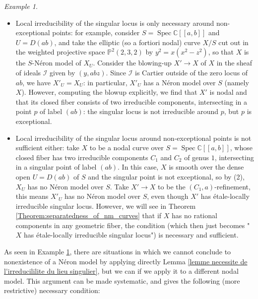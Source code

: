 \documentclass[a4paper,10pt,twoside]{article}
\newcommand{\ra}{\rightarrow}
\renewcommand{\P}{\mathbb{P}}
\newcommand{\C}{\mathbb{C}}
\DeclareMathOperator{\spec}{Spec}
\theoremstyle{definition}
\theoremstyle{remark}
\newtheorem{ex}[thm]{Example}
\begin{document}
\begin{ex}\label{example purity only after blowup}
	\begin{itemize}
		\item Local irreducibility of the singular locus is only necessary around non-exceptional points: for example, consider $S=\spec \C[[a,b]]$ and $U=D(ab)$, and take the elliptic (so a fortiori nodal) curve $X/S$ cut out in the weighted projective space $\P^2(2,3,2)$ by $y^2=x(x^2-z^2)$, so that $X$ is the $S$-N\'eron model of $X_U$. Consider the blowing-up $X'\ra X$ of $X$ in the sheaf of ideals $\mathcal{I}$ given by $(y,abz)$. Since $\mathcal{I}$ is Cartier outside of the zero locus of $ab$, we have $X'_U=X_U$: in particular, $X'_U$ has a N\'eron model over $S$ (namely $X$). However, computing the blowup explicitly, we find that $X'$ is nodal and that its closed fiber consists of two irreducible components, intersecting in a point $p$ of label $(ab)$: the singular locus is not irreducible around $p$, but $p$ is exceptional.
		\item Local irreducibility of the singular locus around non-exceptional points is not sufficient either: take $X$ to be a nodal curve over $S=\spec\C[[a,b]]$, whose closed fiber has two irreducible components $C_1$ and $C_2$ of genus $1$, intersecting in a singular point of label $(ab)$. In this case, $X$ is smooth over the dense open $U=D(ab)$ of $S$ and the singular point is not exceptional, so by (2), $X_U$ has no N\'eron model over $S$. Take $X'\ra X$ to be the $(C_1,a)$-refinement, this means $X'_U$ has no N\'eron model over $S$, even though $X'$ has \'etale-locally irreducible singular locus. However, we will see in Theorem \ref{Theorem:separatedness_of_nm_curves} that if $X$ has no rational components in any geometric fiber, the condition (which then just becomes "$X$ has \'etale-locally irreducible singular locus") is necessary and sufficient.
	\end{itemize}
\end{ex}

As seen in Example \ref{example purity only after blowup}, there are situations in which we cannot conclude to nonexistence of a N\'eron model by applying directly Lemma \ref{lemme necessite de l'irreducililite du lieu singulier}, but we can if we apply it to a different nodal model. This argument can be made systematic, and gives the following (more restrictive) necessary condition:
\end{document}
